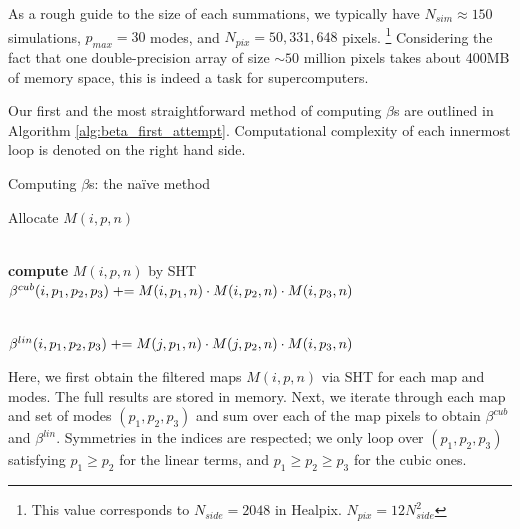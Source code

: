 As a rough guide to the size of each summations, we typically have $N_{sim} \approx 150$ simulations, $p_{max} = 30$ modes, and $N_{pix} = 50,331,648$ pixels. \footnote{This value corresponds to $N_{side} = 2048$ in Healpix. $N_{pix} = 12 N_{side}^2$} Considering the fact that one double-precision array of size $\sim 50$ million pixels takes about 400MB of memory space, this is indeed a task for supercomputers.

Our first and the most straightforward method of computing $\beta$s are outlined in Algorithm \ref{alg:beta_first_attempt}. Computational complexity of each innermost loop is denoted on the right hand side.

\begin{algorithm}[htbp]
	\caption{Computing $\beta$s: the na\"ive method}
	\label{alg:beta_first_attempt}
	\begin{algorithmic}[1] %
		\State Allocate $M(i,p,n)$

		\\
				\State \textbf{compute} $M(i,p,n)$ by SHT
			\EndFor
		\EndFor {}
		\\
		
					\State $\beta^{cub}(i, p_1, p_2, p_3) \mathrel{+}= M(i,p_1,n) \cdot M(i,p_2,n) \cdot M(i,p_3,n)$
				\EndFor
			\EndFor
		\EndFor

		\\	
						\State $\beta^{lin}(i, p_1, p_2, p_3) \mathrel{+}= M(j,p_1,n) \cdot M(j,p_2,n) \cdot M(i,p_3,n)$
					\EndFor
				\EndFor
			\EndFor
		\EndFor

	\end{algorithmic}
\end{algorithm}

Here, we first obtain the filtered maps $M(i,p,n)$ via SHT for each map and modes. The full results are stored in memory. Next, we iterate through each map and set of modes $(p_1, p_2, p_3)$ and sum over each of the map pixels to obtain $\beta^{cub}$ and $\beta^{lin}$. Symmetries in the indices are respected; we only loop over $(p_1,p_2,p_3)$ satisfying $p_1\ge p_2$ for the linear terms, and $p_1\ge p_2\ge p_3$ for the cubic ones.

